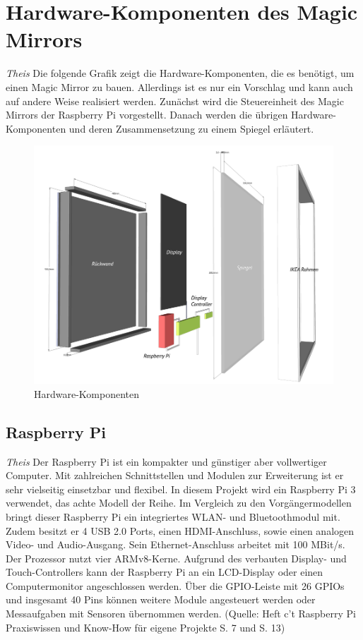 \documentclass[12pt,a4paper]{report}
\begin{document}
\chapter{Hardware-Komponenten des Magic Mirrors}
\textit{Theis}
Die folgende Grafik zeigt die Hardware-Komponenten, die es benötigt, um einen Magic Mirror zu bauen. Allerdings ist es nur ein Vorschlag und kann auch auf andere Weise realisiert werden. Zunächst wird die Steuereinheit des Magic Mirrors der Raspberry Pi vorgestellt. Danach werden die übrigen Hardware-Komponenten und deren Zusammensetzung zu einem Spiegel erläutert. 
\begin{figure}[h]
\hspace{-50pt}
\includegraphics[scale=.5]{Bauteile.png} 
\caption{Hardware-Komponenten}
\end{figure}
\section{Raspberry Pi}
\textit{Theis}
Der Raspberry Pi ist ein kompakter und günstiger aber vollwertiger Computer. Mit zahlreichen Schnittstellen und Modulen zur Erweiterung ist er sehr vielseitig einsetzbar und flexibel. In diesem Projekt wird ein Raspberry Pi 3 verwendet, das achte Modell der Reihe. Im Vergleich zu den Vorgängermodellen bringt dieser Raspberry Pi ein integriertes WLAN- und Bluetoothmodul mit. Zudem besitzt er 4 USB 2.0 Ports, einen HDMI-Anschluss, sowie einen analogen Video- und Audio-Ausgang. Sein Ethernet-Anschluss arbeitet mit 100 MBit/s. Der Prozessor nutzt vier ARMv8-Kerne. Aufgrund des verbauten Display- und Touch-Controllers kann der Raspberry Pi an ein LCD-Display oder einen Computermonitor angeschlossen werden. Über die GPIO-Leiste mit 26 GPIOs und insgesamt 40 Pins können weitere Module angesteuert werden oder Messaufgaben mit Sensoren übernommen werden. (Quelle: Heft c't Raspberry Pi Praxiswissen und Know-How für eigene Projekte S. 7 und S. 13)
\end{document}
